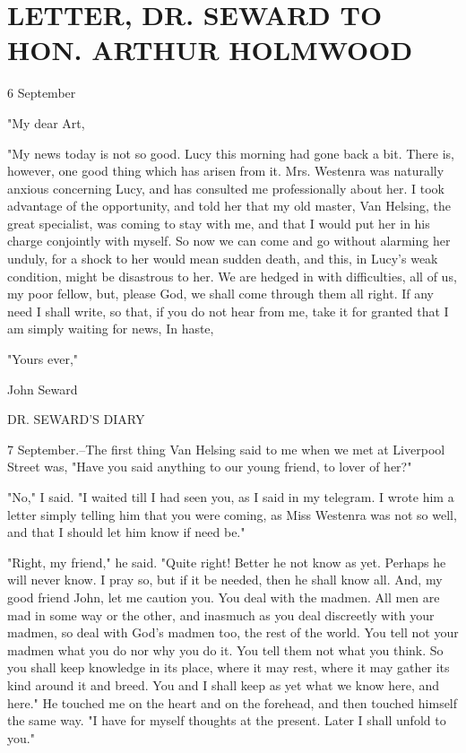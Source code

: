 \chapter{LETTER, DR. SEWARD TO HON. ARTHUR HOLMWOOD}

6 September 

"My dear Art, 

"My news today is not so good. Lucy this morning had gone back a bit. There is, however, one good thing which has arisen from it. Mrs. Westenra was naturally anxious concerning Lucy, and has consulted me professionally about her. I took advantage of the opportunity, and told her that my old master, Van Helsing, the great specialist, was coming to stay with me, and that I would put her in his charge conjointly with myself. So now we can come and go without alarming her unduly, for a shock to her would mean sudden death, and this, in Lucy's weak condition, might be disastrous to her. We are hedged in with difficulties, all of us, my poor fellow, but, please God, we shall come through them all right. If any need I shall write, so that, if you do not hear from me, take it for granted that I am simply waiting for news, In haste, 

"Yours ever," 

John Seward 

DR. SEWARD'S DIARY 

7 September.--The first thing Van Helsing said to me when we met at Liverpool Street was, "Have you said anything to our young friend, to lover of her?" 

"No," I said. "I waited till I had seen you, as I said in my telegram. I wrote him a letter simply telling him that you were coming, as Miss Westenra was not so well, and that I should let him know if need be." 

"Right, my friend," he said. "Quite right! Better he not know as yet. Perhaps he will never know. I pray so, but if it be needed, then he shall know all. And, my good friend John, let me caution you. You deal with the madmen. All men are mad in some way or the other, and inasmuch as you deal discreetly with your madmen, so deal with God's madmen too, the rest of the world. You tell not your madmen what you do nor why you do it. You tell them not what you think. So you shall keep knowledge in its place, where it may rest, where it may gather its kind around it and breed. You and I shall keep as yet what we know here, and here." He touched me on the heart and on the forehead, and then touched himself the same way. "I have for myself thoughts at the present. Later I shall unfold to you." 

